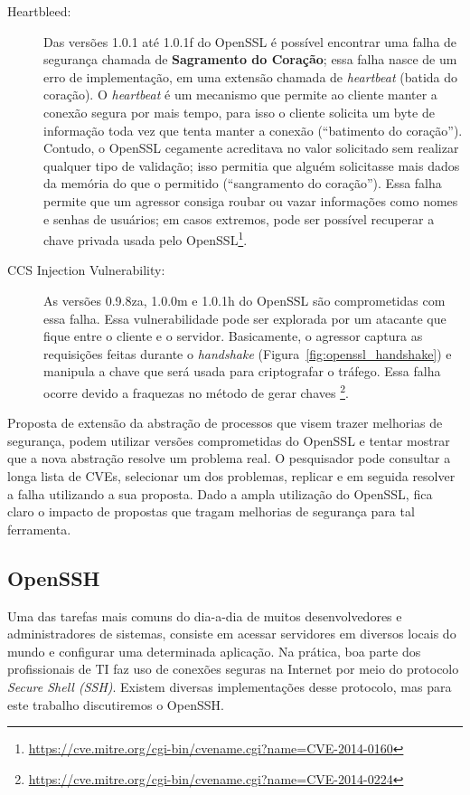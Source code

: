 \begin{description}
  \item [Heartbleed:] Das versões 1.0.1 até 1.0.1f do OpenSSL é possível
encontrar uma falha de segurança chamada de \textbf{Sagramento do Coração};
essa falha nasce de um erro de implementação, em uma extensão chamada de
\emph{heartbeat} (batida do coração). O \emph{heartbeat} é um mecanismo que
permite ao cliente manter a conexão segura por mais tempo, para isso o cliente
solicita um byte de informação toda vez que tenta manter a conexão (``batimento
do coração''). Contudo, o OpenSSL cegamente acreditava no valor solicitado sem
realizar qualquer tipo de validação; isso permitia que alguém solicitasse mais
dados da memória do que o permitido (``sangramento do coração''). Essa falha
permite que um agressor consiga roubar ou vazar informações como nomes e
senhas de usuários; em casos extremos, pode ser possível recuperar a chave
privada usada pelo OpenSSL\footnote{\url{https://cve.mitre.org/cgi-bin/cvename.cgi?name=CVE-2014-0160}}.

  \item [CCS Injection Vulnerability:] As versões 0.9.8za, 1.0.0m e 1.0.1h do
OpenSSL são comprometidas com essa falha. Essa vulnerabilidade pode ser
explorada por um atacante que fique entre o cliente e o servidor.  Basicamente,
o agressor captura as requisições feitas durante o \emph{handshake}
(Figura~\ref{fig:openssl_handshake}) e manipula a chave que será usada para
criptografar o tráfego. Essa falha ocorre devido a fraquezas no método de gerar
chaves
\footnote{\url{https://cve.mitre.org/cgi-bin/cvename.cgi?name=CVE-2014-0224}}.

\end{description}

Proposta de extensão da abstração de processos que visem trazer melhorias de
segurança, podem utilizar versões comprometidas do OpenSSL e tentar mostrar que
a nova abstração resolve um problema real. O pesquisador pode consultar a longa
lista de CVEs, selecionar um dos problemas, replicar e em seguida resolver a
falha utilizando a sua proposta. Dado a ampla utilização do OpenSSL, fica claro
o impacto de propostas que tragam melhorias de segurança para tal ferramenta.

\subsection{OpenSSH}

Uma das tarefas mais comuns do dia-a-dia de muitos desenvolvedores e
administradores de sistemas, consiste em acessar servidores em diversos locais
do mundo e configurar uma determinada aplicação. Na prática, boa parte dos
profissionais de TI faz uso de conexões seguras na Internet por meio do
protocolo \emph{Secure Shell (SSH)}. Existem diversas implementações desse
protocolo, mas para este trabalho discutiremos o OpenSSH.

